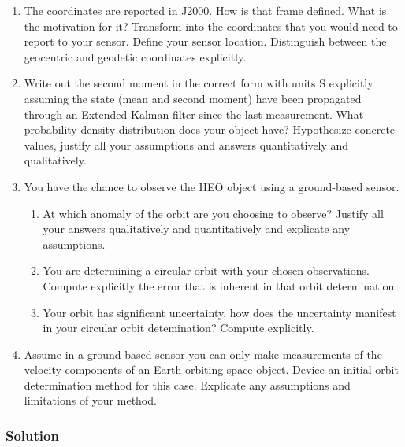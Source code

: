\documentclass[
]{article}
\providecommand{\tightlist}{%
  \setlength{\itemsep}{0pt}\setlength{\parskip}{0pt}}
\begin{document}
\begin{enumerate}
\tightlist
\item
  The coordinates are reported in J2000. How is that frame defined. What
  is the motivation for it? Transform into the coordinates that you
  would need to report to your sensor. Define your sensor location.
  Distinguish between the geocentric and geodetic coordinates
  explicitly.
\item
  Write out the second moment in the correct form with units S
  explicitly assuming the state (mean and second moment) have been
  propagated through an Extended Kalman filter since the last
  measurement. What probability density distribution does your object
  have? Hypothesize concrete values, justify all your assumptions and
  answers quantitatively and qualitatively.
\item
  You have the chance to observe the HEO object using a ground-based
  sensor.

  \begin{enumerate}
  \tightlist
  \item
    At which anomaly of the orbit are you choosing to observe? Justify
    all your answers qualitatively and quantitatively and explicate any
    assumptions.
  \item
    You are determining a circular orbit with your chosen observations.
    Compute explicitly the error that is inherent in that orbit
    determination.
  \item
    Your orbit has significant uncertainty, how does the uncertainty
    manifest in your circular orbit detemination? Compute explicitly.
  \end{enumerate}
\item
  Assume in a ground-based sensor you can only make measurements of the
  velocity components of an Earth-orbiting space object. Device an
  initial orbit determination method for this case. Explicate any
  assumptions and limitations of your method.
\end{enumerate}

\subsubsection{Solution}\label{solution-6}
\end{document}
